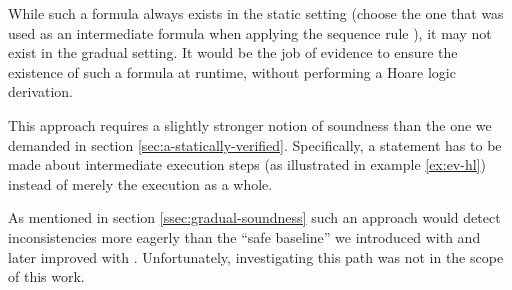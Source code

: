 \begin{description}
\begin{example}{}
        While such a formula always exists in the static setting (choose the one that was used as an intermediate formula when applying the sequence rule ), it may not exist in the gradual setting.
        It would be the job of evidence to ensure the existence of such a formula at runtime, without performing a Hoare logic derivation.
    \end{example}
    
    This approach requires a slightly stronger notion of soundness than the one we demanded in section \ref{sec:a-statically-verified}.
    Specifically, a statement has to be made about intermediate execution steps (as illustrated in example \ref{ex:ev-hl}) instead of merely the execution as a whole.
    
    As mentioned in section \ref{ssec:gradual-soundness} such an approach would detect inconsistencies more eagerly than the “safe baseline” we introduced with  and later improved with .
    Unfortunately, investigating this path was not in the scope of this work.
\end{description}

